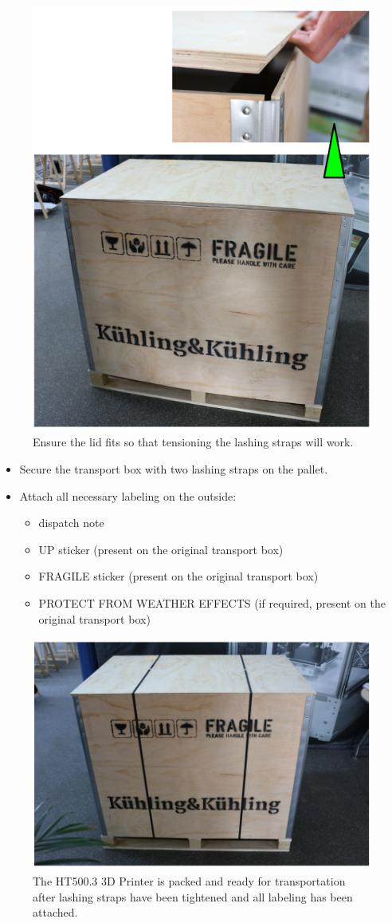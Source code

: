 \begin{figure}[H]
  \centering
  \includegraphics[width=.7\linewidth]{./img/packstep7.png}
  \caption{Ensure the lid fits so that tensioning the lashing straps will work.}
\end{figure}

\begin{itemize}
  \item Secure the transport box with two lashing straps on the pallet.
  \item Attach all necessary labeling on the outside:
    \begin{itemize}
      \item dispatch note
      \item UP sticker (present on the original transport box)
      \item FRAGILE sticker (present on the original transport box)
      \item PROTECT FROM WEATHER EFFECTS (if required, present on the original transport box)
    \end{itemize}
\end{itemize}

\begin{figure}[H]
  \centering
  \includegraphics[width=.7\linewidth]{./img/packstep8.png}
  \caption{The HT500.3 3D Printer is packed and ready for transportation 
           after lashing straps have been tightened and all labeling has been attached.}
\end{figure}



